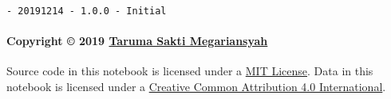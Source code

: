 \documentclass[11pt]{article}
\begin{document}
\begin{verbatim}
- 20191214 - 1.0.0 - Initial
\end{verbatim}

\hypertarget{copyright-2019-taruma-sakti-megariansyah}{%
\paragraph{\texorpdfstring{Copyright © 2019
\href{https://taruma.github.io}{Taruma Sakti
Megariansyah}}{Copyright © 2019 Taruma Sakti Megariansyah}}\label{copyright-2019-taruma-sakti-megariansyah}}

Source code in this notebook is licensed under a
\href{https://choosealicense.com/licenses/mit/}{MIT License}. Data in
this notebook is licensed under a
\href{https://creativecommons.org/licenses/by/4.0/}{Creative Common
Attribution 4.0 International}.


    
    
    
\end{document}
